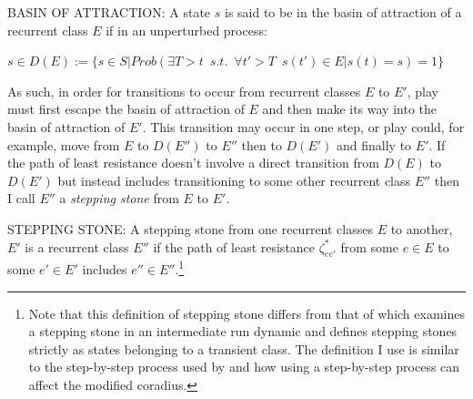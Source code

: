 \begin{definition}
    BASIN OF ATTRACTION: A state $s$ is said to be in the basin of attraction of a recurrent class $E$ if in an unperturbed process:
    
    $s \in D(E):= \{s \in S | Prob( \exists T > t \hspace{6pt} s.t. \hspace{6pt} \forall t' > T \hspace{6pt} s(t') \in E | s(t)=s)=1\}$
\end{definition}

As such, in order for transitions to occur from recurrent classes $E$ to $E'$, play must first escape the basin of attraction of $E$ and then make its way into the basin of attraction of $E'$. This transition may occur in one step, or play could, for example, move from $E$ to $D(E'')$ to $E''$ then to $D(E')$ and finally to $E'$. If the path of least resistance doesn't involve a direct transition from $D(E)$ to $D(E')$ but instead includes transitioning to some other recurrent class $E''$ then I call $E''$ a \textit{stepping stone} from $E$ to $E'$.
    
\begin{definition}
    STEPPING STONE: A stepping stone from one recurrent classes $E$ to another, $E'$ is a recurrent class $E''$ 
    if the path of least resistance $\zeta^*_{ee'}$ from some $e \in E$ to some $e' \in E'$ includes $e'' \in E''$.\footnote{Note that this definition of stepping stone differs from that of \cite{gulesci2023stepping} which examines a stepping stone in an intermediate run dynamic and defines stepping stones strictly as states belonging to a transient class. The definition I use is similar to the step-by-step process used by \cite{ellison2000basins} and how using a step-by-step process can affect the modified coradius.}
\end{definition}

